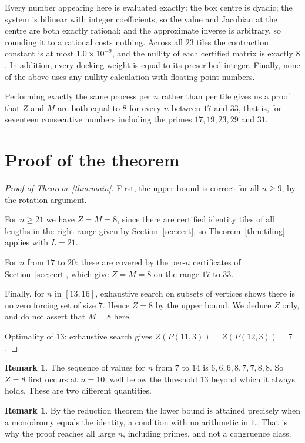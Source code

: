 \documentclass[11pt]{article}
\theoremstyle{definition}
\newtheorem{remark}[theorem]{Remark}
\begin{document}
Every number appearing here is evaluated exactly: the box centre is dyadic; the
system is bilinear with integer coefficients, so the value and Jacobian at the
centre are both exactly rational; and the approximate inverse is arbitrary, so
rounding it to a rational costs nothing. Across all $23$ tiles the contraction
constant is at most $1.0\times10^{-9}$, and the nullity of each certified matrix
is exactly $8$. In addition, every docking weight is equal to its prescribed
integer. Finally, none of the above uses any nullity calculation with
floating-point numbers.

Performing exactly the same process per $n$ rather than per tile gives us a
proof that $Z$ and $M$ are both equal to $8$ for every $n$ between $17$ and
$33$, that is, for seventeen consecutive numbers including the primes
$17,19,23,29$ and $31$.

\section{Proof of the theorem}\label{sec:proof}

\begin{proof}[Proof of Theorem~\ref{thm:main}]
First, the upper bound is correct for all $n\ge9$, by the rotation argument.

For $n\ge21$ we have $Z=M=8$, since there are certified identity tiles of all
lengths in the right range given by Section~\ref{sec:cert}, so
Theorem~\ref{thm:tiling} applies with $L=21$.

For $n$ from $17$ to $20$: these are covered by the per-$n$ certificates of
Section~\ref{sec:cert}, which give $Z=M=8$ on the range $17$ to $33$.

Finally, for $n$ in $[13,16]$, exhaustive search on subsets of vertices shows
there is no zero forcing set of size $7$. Hence $Z=8$ by the upper bound. We
deduce $Z$ only, and do not assert that $M=8$ here.

Optimality of $13$: exhaustive search gives $Z(P(11,3))=Z(P(12,3))=7$.
\end{proof}

\begin{remark}
The sequence of values for $n$ from $7$ to $14$ is $6,6,6,8,7,7,8,8$. So $Z=8$
first occurs at $n=10$, well below the threshold $13$ beyond which it always
holds. These are two different quantities.
\end{remark}

\begin{remark}
By the reduction theorem the lower bound is attained precisely when a monodromy
equals the identity, a condition with no arithmetic in it. That is why the proof
reaches all large $n$, including primes, and not a congruence class.
\end{remark}
\end{document}
